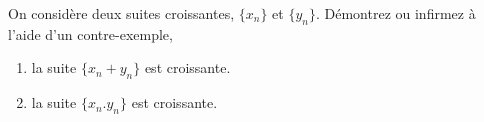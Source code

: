 
\begin{exercice}\label{exo0009}

On considère deux suites croissantes, $\{x_n\}$ et $\{y_n\}$. Démontrez ou infirmez à l'aide d'un contre-exemple,
\begin{enumerate}
	\item la suite $\{x_n+y_n\}$ est croissante.
	\item la suite $\{x_n.y_n\}$ est croissante.
\end{enumerate}

\end{exercice}
